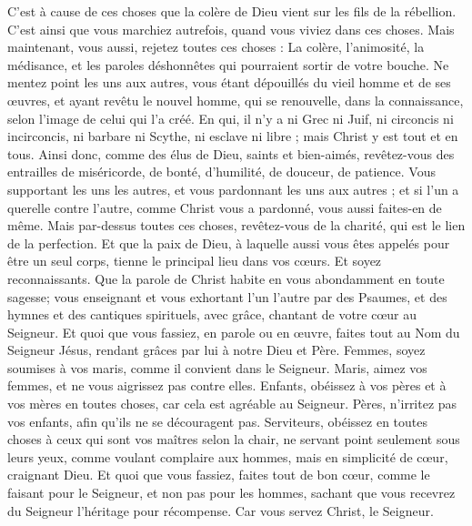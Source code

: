 \begin{multicols}{2}
C'est à cause de ces choses que la colère de Dieu vient sur les fils de la rébellion.
C'est ainsi que vous marchiez autrefois, quand vous viviez dans ces choses.
Mais maintenant, vous aussi, rejetez toutes ces choses : La colère, l'animosité, la médisance, et les paroles déshonnêtes qui pourraient sortir de votre bouche.
Ne mentez point les uns aux autres, vous étant dépouillés du vieil homme et de ses œuvres,
et ayant revêtu le nouvel homme, qui se renouvelle, dans la connaissance, selon l'image de celui qui l'a créé.
En qui, il n'y a ni Grec ni Juif, ni circoncis ni incirconcis, ni barbare ni Scythe, ni esclave ni libre ; mais Christ y est tout et en tous.
Ainsi donc, comme des élus de Dieu, saints et bien-aimés, revêtez-vous des entrailles de miséricorde, de bonté, d'humilité, de douceur, de patience.
Vous supportant les uns les autres, et vous pardonnant les uns aux autres ; et si l'un a querelle contre l'autre, comme Christ vous a pardonné, vous aussi faites-en de même.
Mais par-dessus toutes ces choses, revêtez-vous de la charité, qui est le lien de la perfection.
Et que la paix de Dieu, à laquelle aussi vous êtes appelés pour être un seul corps, tienne le principal lieu dans vos cœurs. Et soyez reconnaissants.
Que la parole de Christ habite en vous abondamment en toute sagesse; vous enseignant et vous exhortant l'un l'autre par des Psaumes, et des hymnes et des cantiques spirituels, avec grâce, chantant de votre cœur au Seigneur.
Et quoi que vous fassiez, en parole ou en œuvre, faites tout au Nom du Seigneur Jésus, rendant grâces par lui à notre Dieu et Père.
Femmes, soyez soumises à vos maris, comme il convient dans le Seigneur.
Maris, aimez vos femmes, et ne vous aigrissez pas contre elles.
Enfants, obéissez à vos pères et à vos mères en toutes choses, car cela est agréable au Seigneur.
Pères, n'irritez pas vos enfants, afin qu'ils ne se découragent pas.
Serviteurs, obéissez en toutes choses à ceux qui sont vos maîtres selon la chair, ne servant point seulement sous leurs yeux, comme voulant complaire aux hommes, mais en simplicité de cœur, craignant Dieu.
Et quoi que vous fassiez, faites tout de bon cœur, comme le faisant pour le Seigneur, et non pas pour les hommes,
sachant que vous recevrez du Seigneur l'héritage pour récompense. Car vous servez Christ, le Seigneur.

\end{multicols}
